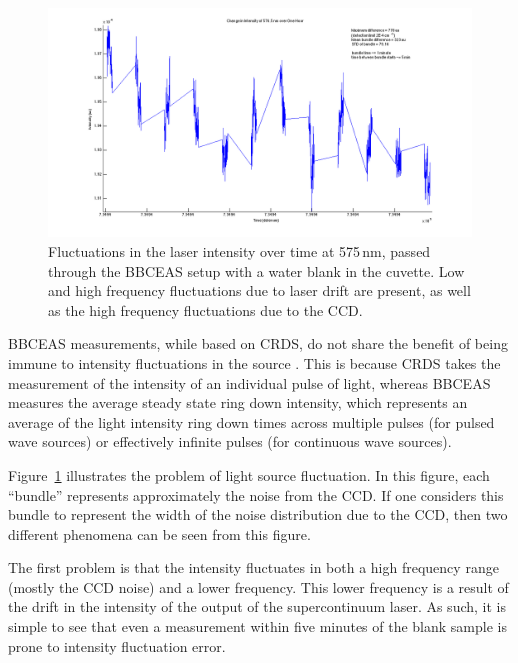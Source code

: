 \begin{figure}[h!]
\begin{center}
\includegraphics[width=\textwidth]{figures/change_in_intensity_of_576_5nm_over_one_hour.png}
\end{center}
\caption{Fluctuations in the laser intensity over time at 575\,nm, passed through the \ac{BBCEAS} setup with a water blank in the cuvette. Low and high frequency fluctuations due to laser drift are present, as well as the high frequency fluctuations due to the \ac{CCD}.}
\label{fig:laser_fluc}
\end{figure}

\ac{BBCEAS} measurements, while based on \ac{CRDS}, do not share the benefit of
being immune to intensity fluctuations in the source \cite{Berden:2009wk}. This
is because \ac{CRDS} takes the measurement of the intensity of an individual
pulse of light, whereas \ac{BBCEAS} measures the average steady state ring down
intensity, which represents an average of the light intensity ring down times
across multiple pulses (for pulsed wave sources) or effectively infinite pulses
(for continuous wave sources).

Figure~\ref{fig:laser_fluc} illustrates the problem of light source
fluctuation. In this figure, each ``bundle'' represents approximately the
noise from the \ac{CCD}. If one considers this bundle to represent the
width of the noise distribution due to the \ac{CCD}, then two different
phenomena can be seen from this figure.

The first problem is that the intensity fluctuates in both a
high frequency range (mostly the \ac{CCD} noise) and a lower frequency. This
lower frequency is a result of the drift in the intensity of the output of the
supercontinuum laser. As such, it is simple to see that even a measurement
within five minutes of the blank sample is prone to intensity fluctuation
error.

